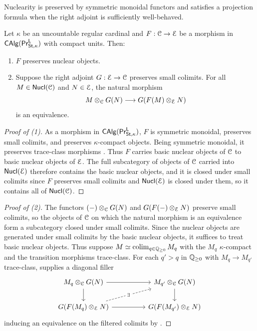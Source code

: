 Nuclearity is preserved by symmetric monoidal functors and satisfies a projection formula when the right adjoint is sufficiently well-behaved. 
\begin{proposition}\label{prop: preservation of nuclearity}
    Let $\kappa$ be an uncountable regular cardinal and $F:\EuScript{C}\to\EuScript{E}$ be a morphism in $\mathsf{CAlg}(\mathsf{Pr}^{\mathsf{L}}_{\mathsf{St},\kappa})$ with compact units. Then:
    \begin{enumerate}
        \item $F$ preserves nuclear objects. 
        \item Suppose the right adjoint $G:\EuScript{E}\to\EuScript{C}$ preserves small colimits. For all $M\in\mathsf{Nucl}(\EuScript{C})$ and $N\in\EuScript{E}$, the natural morphism
        $$M\otimes_{\EuScript{C}}G(N)\longrightarrow G(F(M)\otimes_{\EuScript{E}}N)$$
        is an equivalence.
    \end{enumerate}
\end{proposition}
\begin{proof}[Proof of (1)]
    As a morphism in $\mathsf{CAlg}(\mathsf{Pr}^{\mathsf{L}}_{\mathsf{St},\kappa})$, $F$ is symmetric monoidal, preserves small colimits, and preserves $\kappa$-compact objects. Being symmetric monoidal, it preserves trace-class morphisms \cite[Rmk. 3.2]{RamziLocRigid}. Thus $F$ carries basic nuclear objects of $\EuScript{C}$ to basic nuclear objects of $\EuScript{E}$. The full subcategory of objects of $\EuScript{C}$ carried into $\mathsf{Nucl}(\EuScript{E})$ therefore contains the basic nuclear objects, and it is closed under small colimits since $F$ preserves small colimits and $\mathsf{Nucl}(\EuScript{E})$ is closed under them, so it contains all of $\mathsf{Nucl}(\EuScript{C})$.
\end{proof}
\begin{proof}[Proof of (2)]
    The functors $(-)\otimes_{\EuScript{C}}G(N)$ and $G(F(-)\otimes_{\EuScript{E}}N)$ preserve small colimits, so the objects of $\EuScript{C}$ on which the natural morphism is an equivalence form a subcategory closed under small colimits. Since the nuclear objects are generated under small colimits by the basic nuclear objects, it suffices to treat basic nuclear objects. Thus suppose $M\simeq\operatorname*{colim}_{q\in\mathbb{Q}_{\geq0}}M_{q}$ with the $M_{q}$ $\kappa$-compact and the transition morphisms trace-class. For each $q'>q$ in $\mathbb{Q}_{\geq0}$ with $M_{q}\to M_{q'}$ trace-class, \cite[Prop. 3.4]{RamziLocRigid} supplies a diagonal filler 
    $$%
    \begin{tikzcd}
        {M_{q}\otimes_{\Cscr}G(N)} && {M_{q'}\otimes_{\Cscr}G(N)} \\
        {G(F(M_{q})\otimes_{\Escr}N)} && {G(F(M_{q'})\otimes_{\Escr}N)}
        \arrow[from=1-1, to=1-3]
        \arrow[from=1-1, to=2-1]
        \arrow[from=1-3, to=2-3]
        \arrow["\exists"{description}, dashed, from=2-1, to=1-3]
        \arrow[from=2-1, to=2-3]
    \end{tikzcd}$$
    inducing an equivalence on the filtered colimits by \cite[Lem. 2.16]{AokiSchwartz}. 
\end{proof}

